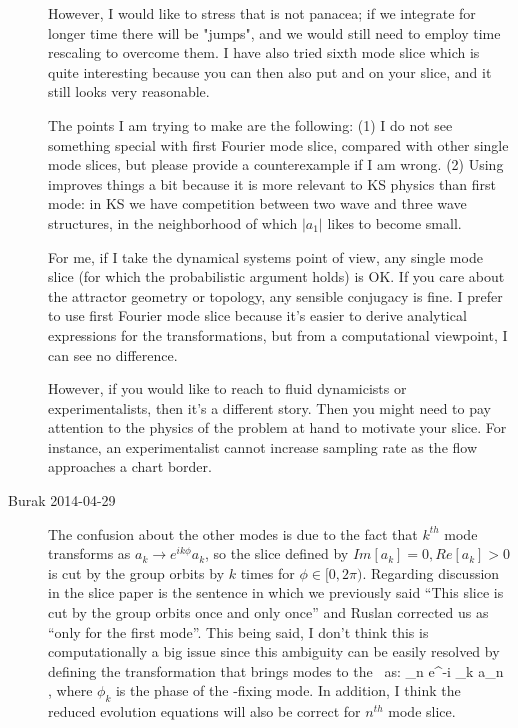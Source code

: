 \begin{description}
However, I would like to stress that {\sFslice} is not
panacea; if we integrate for longer time there will be "jumps", and we
would still need to employ time rescaling to overcome them. I have also
tried sixth mode slice which is quite interesting because you can then
also put  and  on your slice, and it still looks very
reasonable.

The points I am trying to make are the following: (1) I do not see something special
with first Fourier mode slice, compared with other single mode slices, but please
provide a counterexample if I am wrong. (2) Using {\sFslice} improves
things a bit because it is more relevant to KS physics than first mode: in KS we have
competition between two wave and three wave structures, in the neighborhood of
which $|a_1|$ likes to become small.

For me, if I take the dynamical systems point of view, any single mode slice (for which
the probabilistic argument holds) is OK. If you care about the attractor geometry or
topology, any sensible conjugacy is fine. I prefer to use first Fourier mode slice
because it's easier to derive analytical expressions for the transformations, but
from a computational viewpoint, I can see no difference.

However, if you would like to reach to fluid dynamicists or experimentalists,
then it's a different story. Then you might need to pay attention to the physics of
the problem at hand to motivate your slice. For instance, an experimentalist cannot
increase sampling rate as the flow approaches a chart border.

\renewcommand{\ssp}{a}

\item[Burak 2014-04-29] The confusion about the other modes is due to
the fact that $k^{th}$ mode transforms as $\ssp_k \rightarrow e^{i k \phi} \ssp_k$,
so the slice defined by $Im[\ssp_k] = 0, Re[\ssp_k] > 0$ is cut by the group orbits
by $k$ times for $\phi \in [0, 2 \pi)$. Regarding discussion in the slice paper
is the sentence in which we previously said ``This slice is cut by the group
orbits once and only once'' and Ruslan corrected us as ``only for the first
mode''. This being said, I don't think this is computationally a big issue
since this ambiguity can be easily resolved by defining the transformation
that brings modes to the \slice\ as:
\beq
   \sspRed_n \rightarrow e^{-i \phi_k} \ssp_n \, ,
\eeq
where $\phi_k$ is the phase of the \slice -fixing mode. In addition, I
think the reduced evolution equations will also be correct for $n^{th}$
mode slice.


\end{description}
